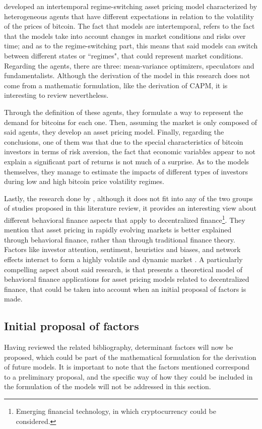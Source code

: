 \parencite{koutmos2021intertemporal} developed an intertemporal regime-switching asset pricing model characterized by heterogeneous agents that have different expectations in relation to the volatility of the prices of bitcoin. The fact that models are intertemporal, refers to the fact that the models take into account changes in market conditions and risks over time; and as to the regime-switching part, this means that said models can switch between different states or ``regimes", that could represent market conditions. Regarding the agents, there are three: mean-variance optimizers, speculators and fundamentalists. Although the derivation of the model in this research does not come from a mathematic formulation, like the derivation of CAPM, it is interesting to review nevertheless. 

Through the definition of these agents, they formulate a way to represent the demand for bitcoins for each one. Then, assuming the market is only composed of said agents, they develop an asset pricing model. Finally, regarding the conclusions, one of them was that due to the special characteristics of bitcoin investors in terms of risk aversion, the fact that economic variables appear to not explain a significant part of returns is not much of a surprise. As to the models themselves, they manage to estimate the impacts of different types of investors during low and high bitcoin price volatility regimes. 

Lastly, the research done by \parencite{Bennett2023}, although it does not fit into any of the two groups of studies proposed in this literature review, it provides an interesting view about different behavioral finance aspects that apply to decentralized finance\footnote{Emerging financial technology, in which cryptocurrency could be considered.}. They mention that asset pricing in rapidly evolving markets is better explained through behavioral finance, rather than through traditional finance theory. Factors like investor attention, sentiment, heuristics and biases, and network effects interact to form a highly volatile and dynamic market \parencite{Bennett2023}. A particularly compelling aspect about said research, is that presents a theoretical model of behavioral finance applications for asset pricing models related to decentralized finance, that could be taken into account when an initial proposal of factors is made. 

\subsection{Initial proposal of factors}
Having reviewed the related bibliography, determinant factors will now be proposed, which could be part of the mathematical formulation for the derivation of future models. It is important to note that the factors mentioned correspond to a preliminary proposal, and the specific way of how they could be included in the formulation of the models will not be addressed in this section.

